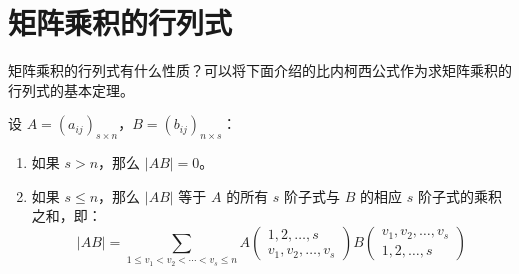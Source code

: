 
\section{矩阵乘积的行列式}

矩阵乘积的行列式有什么性质？可以将下面介绍的比内柯西公式作为求矩阵乘积的行列式的基本定理。

\begin{theorem}[比内柯西公式]
	设 $A = (a_{ij})_{s \times n}$，$B = (b_{ij})_{n \times s}$：

	\begin{enumerate}
		\item 如果 $s > n$，那么 $|AB| = 0$。
		\item 如果 $s \le n$，那么 $|AB|$ 等于 $A$ 的所有 $s$ 阶子式与 $B$ 的相应 $s$ 阶子式的乘积之和，即：
		$$
		|AB| = \sum\limits_{1 \le v_1 < v_2 < \cdots < v_s \le n} A \begin{pmatrix} 1, 2, \ldots, s \\ v_1, v_2, \ldots, v_s \end{pmatrix} B \begin{pmatrix} v_1, v_2, \ldots, v_s \\ 1, 2, \ldots, s \end{pmatrix}
		$$
	\end{enumerate}
\end{theorem}

